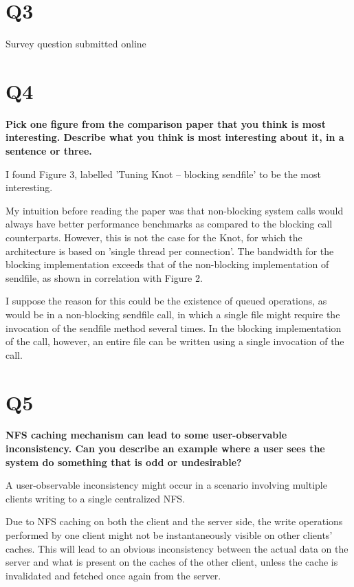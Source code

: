 \documentclass[a4paper]{article}
\begin{document}

\section{Q3} %
\label{sec:q3}
    Survey question submitted online


\section{Q4} %
\label{sec:q4}

    \textbf{Pick one figure from the comparison paper that you think is most interesting. Describe what you think is most interesting about it, in a sentence or three.}

    I found Figure 3, labelled 'Tuning Knot – blocking sendfile' to be the most interesting.

    My intuition before reading the paper was that non-blocking system calls would always have better performance benchmarks as compared to the blocking call counterparts. 
    However, this is not the case for the Knot, for which the architecture is based on 'single thread per connection'. 
    The bandwidth for the blocking implementation exceeds that of the non-blocking implementation of sendfile, as shown in correlation with Figure 2.

    I suppose the reason for this could be the existence of queued operations, as would be in a non-blocking sendfile call, in which a single file might require the invocation of the sendfile method several times. 
    In the blocking implementation of the call, however, an entire file can be written using a single invocation of the call.


\section{Q5} %
\label{sec:q5}

    \textbf{NFS caching mechanism can lead to some user-observable inconsistency. Can you describe an example where a user sees the system do something that is odd or undesirable?}

    A user-observable inconsistency might occur in a scenario involving multiple clients writing to a single centralized NFS.

    Due to NFS caching on both the client and the server side, the write operations performed by one client might not be instantaneously visible on other clients’ caches. This will lead to an obvious inconsistency between the actual data on the server and what is present on the caches of the other client, unless the cache is invalidated and fetched once again from the server.
\end{document}
